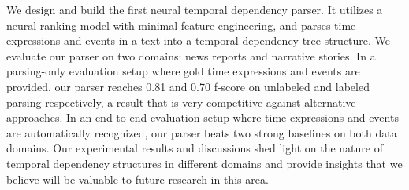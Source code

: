 We design and build the first neural temporal dependency parser. It utilizes a neural ranking model with minimal feature engineering, and parses time expressions and events in a text into a temporal dependency tree structure. We evaluate our parser on two domains: news reports and narrative stories. In a parsing-only evaluation setup where gold time expressions and events are provided, our parser reaches 0.81 and 0.70 f-score on unlabeled and labeled parsing respectively, a result that is very competitive against alternative approaches. In an end-to-end evaluation setup where time expressions and events are automatically recognized, our parser beats two strong baselines on both data domains. Our experimental results and discussions shed light on the nature of temporal dependency structures in different domains and provide insights that we believe will be valuable to future research in this area.
